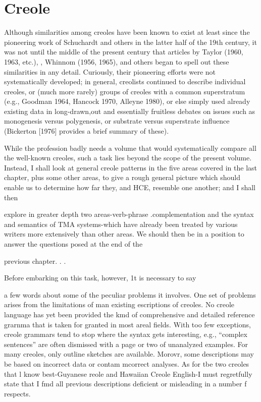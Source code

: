 \chapter{Creole}

Although similarities among creoles have been known to exist at least since the pioneering work of Schuchardt and others in the latter half of the 19th century, it was not until the middle of the present century that articles by Taylor (1960, 1963, etc.), \citet{Thompson1961}, Whinnom (1956, 1965), and others began to spell out these similarities in any detail. Curiously, their pioneering efforts were not systematically developed; in general, creolists continued to describe individual creoles, or (much more rarely) groups of creoles with a common superstratum (e.g., Goodman 1964, Hancock 1970, Alleyne 1980), or else simply used already existing data in long-drawn,out and essentially fruitless debates on issues such as monogenesis versus poly\-genesis, or substrate versus superstrate influence (Bickerton [1976] provides a brief summary of these).

While the profession badly needs a volume that would systema\-tically compare all the well-known creoles, such a task lies beyond the scope of the present volume. Instead, I shall look at general creole patterns in the five areas covered in the last chapter, plus some other areas, to give a rough general picture which should enable us to deter\-mine how far they, and HCE, resemble one another; and I shall then


explore in greater depth two areas-verb-phrase .complementation and the syntax and semantics of TMA systems-which have already been treated by various writers more extensively than other areas. We should then be in a position to answer the questions posed at the end of the

previous chapter. . .

Before embarking on this task, however, 1t is necessary to say

a few words about some of the peculiar problems it involves. One set of problems arises from the limitations of man existing escriptions of creoles. No creole language has yet been provided the kmd of com\-prehensive and detailed reference grarnma that is taken for granted in most areal fields. With too few exceptions, creole grammars tend to stop where the syntax gets interesting, e.g., ``complex sentences'' are often dismissed with a page or two of unanalyzed examples. For many creoles, only outline sketches are available. Morovr, some descriptions may be based on incorrect data or contam mcorrect analyses. As for tbe two creoles that l know best-Guyanese reole and Hawaiian Creole English-I must regretfully state that I fmd all previous descriptions deficient or misleading in a number f respects.

